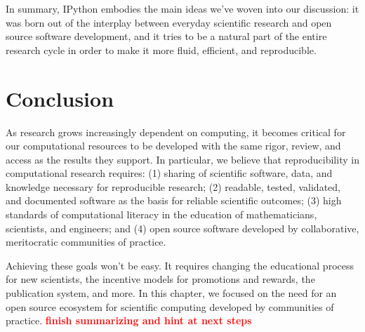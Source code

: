 \documentclass[ChapterTOCs,krantz2]{krantz} %
\newcommand{\fix}[1] { \textcolor{red} {
{\fbox{ {\bf Fix:} \ensuremath{\blacktriangleright }} {\bf #1}
\fbox{\ensuremath{\blacktriangleleft} } } } }
\begin{document}
In summary, IPython embodies the main ideas we've woven into our discussion: it
was born out of the interplay between everyday scientific research and open
source software development, and it tries to be a natural part of the entire
research cycle in order to make it more fluid, efficient, and reproducible.

\section{Conclusion}\label{conclusion}

As research grows increasingly dependent on computing, it becomes critical for
our computational resources to be developed with the same rigor, review,
and access as the results they support. In particular, we believe that
reproducibility in computational research requires: (1) sharing of scientific
software, data, and knowledge necessary for reproducible research; (2)
readable, tested, validated, and documented software as the basis for reliable
scientific outcomes; (3) high standards of computational literacy in the
education of mathematicians, scientists, and engineers; and (4) open source
software developed by collaborative, meritocratic communities of practice.

Achieving these goals won't be easy.  It requires changing the educational
process for new scientists, the incentive models for promotions and rewards,
the publication system, and more. In this chapter, we focused on the need for
an open source ecosystem for scientific computing developed by communities of
practice. \fix{finish summarizing and hint at next steps}


%


\end{document}
